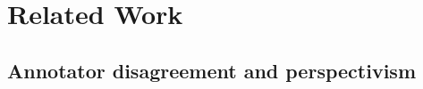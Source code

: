 \section{Related Work}
\label{sec:related}

\subsection{Annotator disagreement and perspectivism}
\label{sec:related:disagreement}
\citep{denton2021whose,uma2021learning,plank2022problem,davani2024d3code,davani2024disentangling,lee2024exploring,gordon2022jury,prabhakaran2024grasp}

